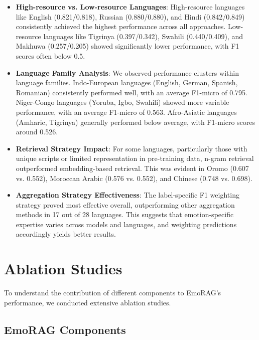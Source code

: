 \documentclass[a4paper,12pt]{extarticle}
\begin{document}
\begin{itemize}
\item \textbf{High-resource vs. Low-resource Languages}: High-resource languages like English (0.821/0.818), Russian (0.880/0.880), and Hindi (0.842/0.849) consistently achieved the highest performance across all approaches. Low-resource languages like Tigrinya (0.397/0.342), Swahili (0.440/0.409), and Makhuwa (0.257/0.205) showed significantly lower performance, with F1 scores often below 0.5.

\item \textbf{Language Family Analysis}: We observed performance clusters within language families. Indo-European languages (English, German, Spanish, Romanian) consistently performed well, with an average F1-micro of 0.795. Niger-Congo languages (Yoruba, Igbo, Swahili) showed more variable performance, with an average F1-micro of 0.563. Afro-Asiatic languages (Amharic, Tigrinya) generally performed below average, with F1-micro scores around 0.526.

\item \textbf{Retrieval Strategy Impact}: For some languages, particularly those with unique scripts or limited representation in pre-training data, n-gram retrieval outperformed embedding-based retrieval. This was evident in Oromo (0.607 vs. 0.552), Moroccan Arabic (0.576 vs. 0.552), and Chinese (0.748 vs. 0.698).

\item \textbf{Aggregation Strategy Effectiveness}: The label-specific F1 weighting strategy proved most effective overall, outperforming other aggregation methods in 17 out of 28 languages. This suggests that emotion-specific expertise varies across models and languages, and weighting predictions accordingly yields better results.
\end{itemize}


\section{Ablation Studies}

To understand the contribution of different components to EmoRAG's performance, we conducted extensive ablation studies.

\subsection{EmoRAG Components}
\end{document}
